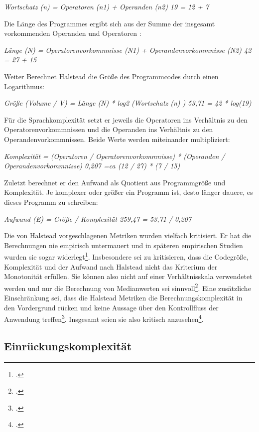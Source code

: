 \emph{Wortschatz (n) = Operatoren (n1) + Operanden (n2) 19 = 12 + 7}

Die Länge des Programmes ergibt sich aus der Summe der insgesamt
vorkommenden Operanden und Operatoren :

\emph{Länge (N) = Operatorenvorkommnisse (N1) + Operandenvorkommnisse
(N2) 42 = 27 + 15}

Weiter Berechnet Halstead die Größe des Programmcodes durch einen
Logarithmus:

\emph{Größe (Volume / V) = Länge (N) * log2 (Wortschatz (n) ) 53,71 = 42
* log(19)}

Für die Sprachkomplexität setzt er jeweils die Operatoren ins Verhältnis
zu den Operatorenvorkommnissen und die Operanden ins Verhältnis zu den
Operandenvorkommnissen. Beide Werte werden miteinander multipliziert:

\emph{Komplexität = (Operatoren / Operatorenvorkommnisse) * (Operanden /
Operandenvorkommnisse) 0,207 =ca (12 / 27) * (7 / 15)}

Zuletzt berechnet er den Aufwand als Quotient aus Programmgröße und
Komplexität. Je komplexer oder größer ein Programm ist, desto länger
dauere, es dieses Programm zu schreiben:

\emph{Aufwand (E) = Größe / Komplexität 259,47 = 53,71 / 0,207}

Die von Halstead vorgeschlagenen Metriken wurden vielfach kritisiert. Er
hat die Berechnungen nie empirisch untermauert und in späteren
empirischen Studien wurden sie sogar widerlegt\footcite[Vgl. ][S. 185]{sneedSoftwareZahlenVermessung2010}. Insbesondere sei zu kritisieren, dass die Codegröße,
Komplexität und der Aufwand nach Halstead nicht das Kriterium der
Monotonität erfüllen. Sie können also nicht auf einer Verhältnisskala
verwendetet werden und nur die Berechnung von Medianwerten sei
sinnvoll\footcite[Vgl. ][S. 142]{zuseSoftwareComplexityMeasures1991}. Eine zusätzliche Einschränkung
sei, dass die Halstead Metriken die Berechnungskomplexität in den
Vordergrund rücken und keine Aussage über den Kontrollfluss der
Anwendung treffen\footcite[Vgl. ][S. 2]{rumreichExaminingSoftwareDesign2019}. Insgesamt seien sie also kritisch anzusehen\footcite[Vgl. ][S. 185]{sneedSoftwareZahlenVermessung2010}.


\subsection{Einrückungskomplexität}\label{Einruckungskomplexitat}

